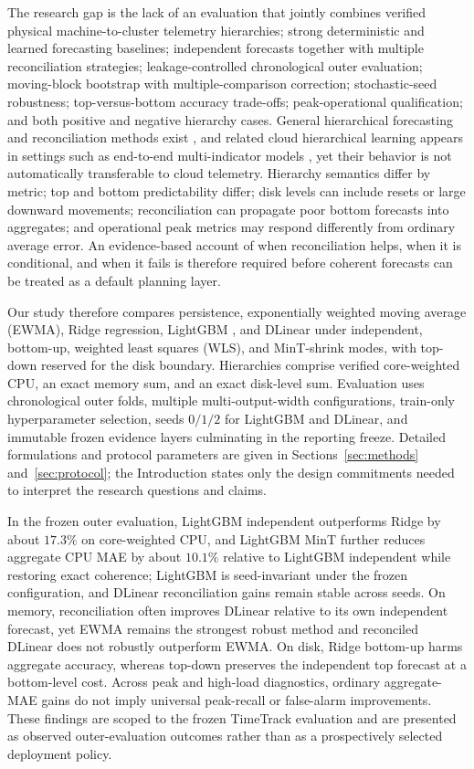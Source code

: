 \documentclass[a4paper,fleqn]{cas-dc}
\begin{document}
The research gap is the lack of an evaluation that jointly combines verified
physical machine-to-cluster telemetry hierarchies; strong deterministic and
learned forecasting baselines; independent forecasts together with multiple
reconciliation strategies; leakage-controlled chronological outer evaluation;
moving-block bootstrap with multiple-comparison correction; stochastic-seed
robustness; top-versus-bottom accuracy trade-offs; peak-operational
qualification; and both positive and negative hierarchy cases.
General hierarchical forecasting and reconciliation methods exist
\cite{wickramasuriya2019mint,athanasopoulos2024hierarchical},
and related cloud hierarchical learning appears in settings such as
end-to-end multi-indicator models
\cite{harmony2024},
yet their behavior is not automatically transferable to cloud telemetry.
Hierarchy semantics differ by metric; top and bottom predictability differ;
disk levels can include resets or large downward movements; reconciliation can
propagate poor bottom forecasts into aggregates; and operational peak metrics
may respond differently from ordinary average error.
An evidence-based account of when reconciliation helps, when it is conditional,
and when it fails is therefore required before coherent forecasts can be treated
as a default planning layer.

Our study therefore compares persistence, exponentially weighted moving average
({EWMA}), Ridge regression, LightGBM
\cite{ke2017lightgbm},
and DLinear
\cite{zeng2023dlinear}
under independent, bottom-up, weighted least squares ({WLS}), and MinT-shrink
modes, with top-down reserved for the disk boundary.
Hierarchies comprise verified core-weighted {CPU}, an exact memory sum, and an
exact disk-level sum.
Evaluation uses chronological outer folds, multiple multi-output-width
configurations, train-only
hyperparameter selection, seeds $0/1/2$ for LightGBM and DLinear, and immutable
frozen evidence layers culminating in the reporting freeze.
Detailed formulations and protocol parameters are given in
Sections~\ref{sec:methods} and~\ref{sec:protocol}; the Introduction states only
the design commitments needed to interpret the research questions and claims.

In the frozen outer evaluation, LightGBM independent outperforms Ridge by about
$17.3\%$ on core-weighted {CPU}, and LightGBM MinT further reduces aggregate
{CPU} {MAE} by about $10.1\%$ relative to LightGBM independent while restoring
exact coherence; LightGBM is seed-invariant under the frozen configuration, and
DLinear reconciliation gains remain stable across seeds.
On memory, reconciliation often improves DLinear relative to its own independent
forecast, yet {EWMA} remains the strongest robust method and reconciled DLinear
does not robustly outperform {EWMA}.
On disk, Ridge bottom-up harms aggregate accuracy, whereas top-down preserves
the independent top forecast at a bottom-level cost.
Across peak and high-load diagnostics, ordinary aggregate-{MAE} gains do not
imply universal peak-recall or false-alarm improvements.
These findings are scoped to the frozen TimeTrack evaluation and are presented
as observed outer-evaluation outcomes rather than as a prospectively selected
deployment policy.
\end{document}
